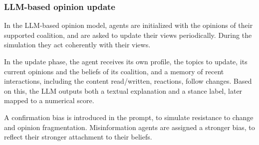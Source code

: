 \subsubsection{LLM-based opinion update}
In the LLM-based opinion model, agents are initialized with the opinions of their supported coalition, and are asked to update their views periodically. During the simulation they act coherently with their views. 

In the update phase, the agent receives its own profile, the topics to update, its current opinions and the beliefs of its coalition, and a memory of recent interactions, including the content read/written, reactions, follow changes.
Based on this, the LLM outputs both a textual explanation and a stance label, later mapped to a numerical score.

A confirmation bias is introduced in the prompt, to simulate resistance to change and opinion fragmentation. 
Misinformation agents are assigned a stronger bias, to reflect their stronger attachment to their beliefs.

